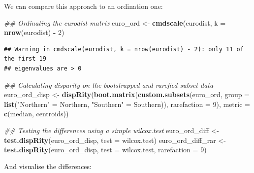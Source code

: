 \documentclass[]{book}
\newenvironment{Shaded}{\begin{snugshade}}{\end{snugshade}}
\newcommand{\CommentTok}[1]{\textcolor[rgb]{0.56,0.35,0.01}{\textit{#1}}}
\newcommand{\DataTypeTok}[1]{\textcolor[rgb]{0.13,0.29,0.53}{#1}}
\newcommand{\DecValTok}[1]{\textcolor[rgb]{0.00,0.00,0.81}{#1}}
\newcommand{\KeywordTok}[1]{\textcolor[rgb]{0.13,0.29,0.53}{\textbf{#1}}}
\newcommand{\NormalTok}[1]{#1}
\newcommand{\OperatorTok}[1]{\textcolor[rgb]{0.81,0.36,0.00}{\textbf{#1}}}
\newcommand{\StringTok}[1]{\textcolor[rgb]{0.31,0.60,0.02}{#1}}
\begin{document}
We can compare this approach to an ordination one:

\begin{Shaded}
\begin{Highlighting}[]
\CommentTok{## Ordinating the eurodist matrix}
\NormalTok{euro_ord <-}\StringTok{ }\KeywordTok{cmdscale}\NormalTok{(eurodist, }\DataTypeTok{k =} \KeywordTok{nrow}\NormalTok{(eurodist) }\OperatorTok{-}\StringTok{ }\DecValTok{2}\NormalTok{)}
\end{Highlighting}
\end{Shaded}

\begin{verbatim}
## Warning in cmdscale(eurodist, k = nrow(eurodist) - 2): only 11 of the first 19
## eigenvalues are > 0
\end{verbatim}

\begin{Shaded}
\begin{Highlighting}[]
\CommentTok{## Calculating disparity on the bootstrapped and rarefied subset data}
\NormalTok{euro_ord_disp <-}\StringTok{ }\KeywordTok{dispRity}\NormalTok{(}\KeywordTok{boot.matrix}\NormalTok{(}\KeywordTok{custom.subsets}\NormalTok{(euro_ord, }\DataTypeTok{group =}
        \KeywordTok{list}\NormalTok{(}\StringTok{"Northern"}\NormalTok{ =}\StringTok{ }\NormalTok{Northern, }\StringTok{"Southern"}\NormalTok{ =}\StringTok{ }\NormalTok{Southern)), }\DataTypeTok{rarefaction =} \DecValTok{9}\NormalTok{),}
        \DataTypeTok{metric =} \KeywordTok{c}\NormalTok{(median, centroids))}

\CommentTok{## Testing the differences using a simple wilcox.test}
\NormalTok{euro_ord_diff <-}\StringTok{ }\KeywordTok{test.dispRity}\NormalTok{(euro_ord_disp, }\DataTypeTok{test =}\NormalTok{ wilcox.test)}
\NormalTok{euro_ord_diff_rar <-}\StringTok{ }\KeywordTok{test.dispRity}\NormalTok{(euro_ord_disp, }\DataTypeTok{test =}\NormalTok{ wilcox.test, }\DataTypeTok{rarefaction =} \DecValTok{9}\NormalTok{)}
\end{Highlighting}
\end{Shaded}

And visualise the differences:
\end{document}
